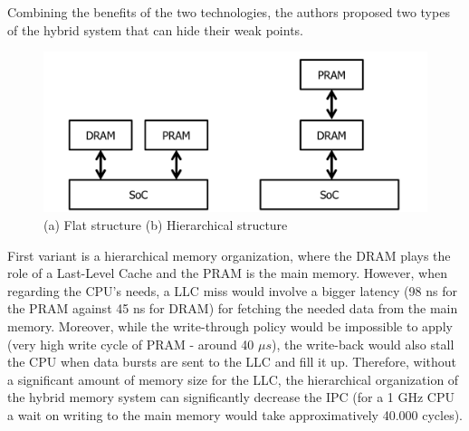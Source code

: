 \documentclass[12pt,journal,compsoc]{IEEEtran}
\begin{document}
Combining the benefits of the two technologies, the authors proposed two types of the hybrid system that can hide their weak points. 
\begin{figure}
	\centering
	\includegraphics[width = 8 cm]{graphics/structure-hybrid.png}
	\caption{(a) Flat structure (b) Hierarchical structure}\label{fig:structure}
\end{figure} 
First variant is a hierarchical memory organization, where the DRAM plays the role of a Last-Level Cache and the PRAM is the main memory. However, when regarding the CPU’s needs, a LLC miss would involve a bigger latency (98 ns for the PRAM against 45 ns for DRAM) for fetching the needed data from the main memory. Moreover, while the write-through policy would be impossible to apply (very high write cycle of PRAM - around 40 $\mu s$), the write-back would also stall the CPU when data bursts are sent to the LLC and fill it up. Therefore, without a significant amount of memory size for the LLC, the hierarchical organization of the hybrid memory system can significantly decrease the IPC (for a 1 GHz CPU a wait on writing to the main memory would take approximatively 40.000 cycles).
\end{document}
